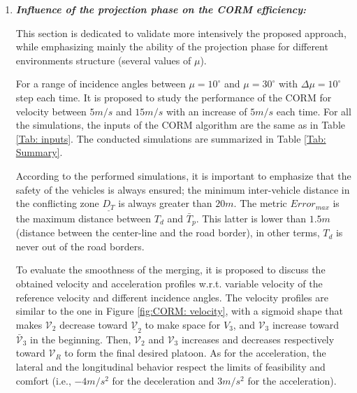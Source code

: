 \begin{enumerate}
 \item \textbf{\textit{Influence of the projection phase on the CORM efficiency:}} 

 This section is dedicated to validate more intensively the proposed approach, while emphasizing mainly the ability of the projection phase for different environments structure (several values of $\mu$). 


 

For a range of incidence angles between $ \mu = 10^\circ$ and $\mu = 30^\circ$ with $\Delta \mu = 10^\circ$ step each time. It is proposed to study the performance of the CORM for velocity between $5 m/s$ and $15 m/s$ with an increase of $5 m/s$ each time. For all the simulations, the inputs of the CORM algorithm are the same as in Table \ref{Tab: inputs}. The conducted simulations are summarized in Table \ref{Tab: Summary}.



According to the performed simulations, it is important to emphasize that the safety of the vehicles is always ensured; the minimum inter-vehicle distance in the conflicting zone $\underline{D_{T}}$  is always greater than $20m$. The metric $Error_{max}$ is the maximum distance between $T_d$ and $\bar{T}_{p}$. This latter is lower than $1.5m$ (distance between the center-line and the road border), in other terms, $T_d$ is never out of the road borders. 

To evaluate the smoothness of the merging, it is proposed to discuss the obtained velocity and acceleration profiles w.r.t. variable velocity of the reference velocity and different incidence angles. The velocity profiles are similar to the one in Figure \ref{fig:CORM: velocity}, with a sigmoid shape that makes $\mathcal{V}_2$ decrease toward $\underline{\mathcal{V}}_2$ to make space for $V_3$, and $\mathcal{V}_3$ increase toward $\bar{\mathcal{V}}_3$ in the beginning. Then, $\mathcal{V}_2$ and $\mathcal{V}_3$ increases and decreases respectively toward $\mathcal{V}_R$ to form the final desired platoon. As for the acceleration, the lateral and the longitudinal behavior respect the limits of feasibility and comfort (i.e., $-4 m/s^2$ for the deceleration and $3m/s^2$ for the acceleration).
 




\end{enumerate}
